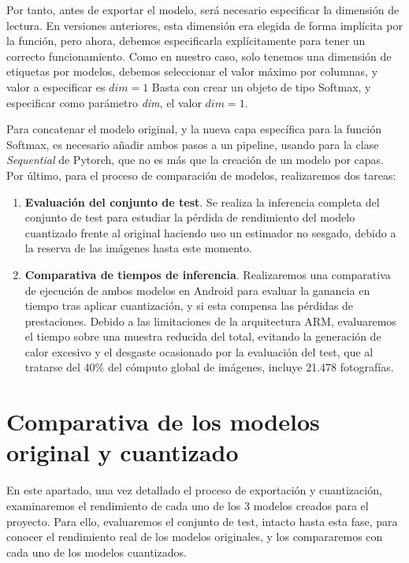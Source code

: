 Por tanto, antes de exportar el modelo, será necesario especificar la dimensión de lectura. En versiones anteriores, esta dimensión era elegida de forma implícita por la función, pero ahora, debemos especificarla explícitamente para tener un correcto funcionamiento. Como en nuestro caso, solo tenemos una dimensión de etiquetas por modelos, debemos seleccionar el valor máximo por columnas, y valor a especificar es $dim = 1$ Basta con crear un objeto de tipo Softmax, y especificar como parámetro \textit{dim}, el valor $dim = 1$.

Para concatenar el modelo original, y la nueva capa específica para la función Softmax, es necesario añadir ambos pasos a un pipeline, usando para la clase \textit{Sequential} de Pytorch, que no es más que la creación de un modelo por capas.\\

Por último, para el proceso de comparación de modelos, realizaremos dos tareas:
\begin{enumerate}
	\item \textbf{Evaluación del conjunto de test}. Se realiza la inferencia completa del conjunto de test para estudiar la pérdida de rendimiento del modelo cuantizado frente al original haciendo uso un estimador no sesgado, debido a la reserva de las imágenes hasta este momento.
	\item \textbf{Comparativa de tiempos de inferencia}. Realizaremos una comparativa de ejecución de ambos modelos en Android para evaluar la ganancia en tiempo tras aplicar cuantización, y si esta compensa las pérdidas de prestaciones. Debido a las limitaciones de la arquitectura ARM, evaluaremos el tiempo sobre una muestra reducida del total, evitando la generación de calor excesivo y el desgaste ocasionado por la evaluación del test, que al tratarse del 40\% del cómputo global de imágenes, incluye 21.478 fotografías.

\end{enumerate}

\section{Comparativa de los modelos original y cuantizado}

En este apartado, una vez detallado el proceso de exportación y cuantización, examinaremos el rendimiento de cada uno de los 3 modelos creados para el proyecto. Para ello, evaluaremos el conjunto de test, intacto hasta esta fase, para conocer el rendimiento real de los modelos originales, y los compararemos con cada uno de los modelos cuantizados.

